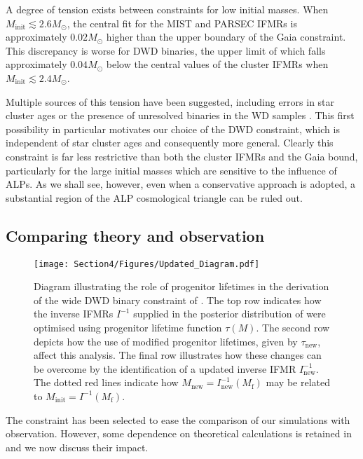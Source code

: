 A degree of tension exists between constraints for low initial masses. When $M_{\mathrm{init}}\lesssim2.6M_{\odot}$, the central fit for the MIST and PARSEC IFMRs is approximately $0.02M_{\odot}$ higher than the upper boundary of the Gaia constraint. This discrepancy is worse for DWD binaries, the upper limit of which falls approximately $0.04M_{\odot}$ below the central values of the cluster IFMRs when $M_{\mathrm{init}}\lesssim2.4M_{\odot}$.


Multiple sources of this tension have been suggested, including errors in star cluster ages or the presence of unresolved binaries in the WD samples \cite{Andrews}. This first possibility in particular motivates our choice of the DWD constraint, which is independent of star cluster ages and consequently more general. Clearly this constraint is far less restrictive than both the cluster IFMRs and the Gaia bound, particularly for the large initial masses which are sensitive to the influence of ALPs. As we shall see, however, even when a conservative approach is adopted, a substantial region of the ALP cosmological triangle can be ruled out.




\subsection{Comparing theory and observation}
\label{subsec: comparing theory and observation}
\begin{figure}[t]
    \centering
    \texttt{[image: Section4/Figures/Updated\_Diagram.pdf]}
    \caption{Diagram illustrating the role of progenitor lifetimes in the derivation of the wide DWD binary constraint of \cite{Andrews}. The top row indicates how the inverse IFMRs $I^{-1}$ supplied in the posterior distribution of \cite{Andrews} were optimised using progenitor lifetime function $\tau(M)$. The second row depicts how the use of modified progenitor lifetimes, given by $\tau_{\mathrm{new}}$, affect this analysis. The final row illustrates how these changes can be overcome by the identification of a updated inverse IFMR $I^{-1}_{\mathrm{new}}$. The dotted red lines indicate how $M_{\mathrm{new}}=I^{-1}_{\mathrm{new}}(M_{\mathrm{f}})$ may be related to $M_{\mathrm{init}}=I^{-1}(M_{\mathrm{f}})$.}
    \label{fig: Progenitor diagram}
\end{figure}
The constraint \cite{Andrews} has been selected to ease the comparison of our simulations with observation. However, some dependence on theoretical calculations is retained in \cite{Andrews} and we now discuss their impact.


